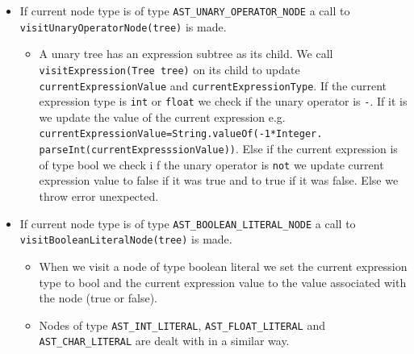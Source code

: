 \begin{itemize}
	\item If current node type is of type \verb!AST_UNARY_OPERATOR_NODE! a call to \verb!visitUnaryOperatorNode(tree)! is made.
	      \begin{itemize}
	      	\item A unary tree has an expression subtree as its child. We call \verb!visitExpression(Tree tree)! on  its child to update \verb!currentExpressionValue! and \verb!currentExpressionType!. If the current expression type is \verb!int! or \verb!float!  we check if the unary operator is \verb!-!. If it is we update the value of the current expression e.g. \verb!currentExpressionValue=String.valueOf(-1*Integer.!
	      	      \verb!parseInt(currentExpresssionValue))!. Else if the current expression is of type bool we check i f the unary operator is \verb!not! we update current expression value to false if it was true and to true if it was false.
	      	      Else we throw error unexpected.
	      \end{itemize}
	      	      	              
	\item If current node type is of type \verb!AST_BOOLEAN_LITERAL_NODE! a call to \verb!visitBooleanLiteralNode(tree)! is made.
	      \begin{itemize}
	      	\item When we visit a node of type boolean literal we set the current expression type to bool and the current expression value to the value associated with the node (true or false).
	      	\item Nodes of type \verb!AST_INT_LITERAL!, \verb!AST_FLOAT_LITERAL! and \verb!AST_CHAR_LITERAL! are dealt with in a similar way.
	      	      	      	      	      	             
	      \end{itemize}
	      	      	               

\end{itemize}
